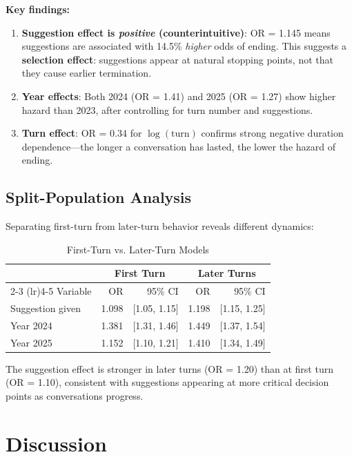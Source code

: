 \documentclass[11pt]{article}
\begin{document}
\textbf{Key findings:}
\begin{enumerate}
    \item \textbf{Suggestion effect is \textit{positive} (counterintuitive)}: OR = 1.145 means suggestions are associated with 14.5\% \textit{higher} odds of ending. This suggests a \textbf{selection effect}: suggestions appear at natural stopping points, not that they cause earlier termination.

    \item \textbf{Year effects}: Both 2024 (OR = 1.41) and 2025 (OR = 1.27) show higher hazard than 2023, after controlling for turn number and suggestions.

    \item \textbf{Turn effect}: OR = 0.34 for $\log(\text{turn})$ confirms strong negative duration dependence---the longer a conversation has lasted, the lower the hazard of ending.
\end{enumerate}

\subsection{Split-Population Analysis}

Separating first-turn from later-turn behavior reveals different dynamics:

\begin{table}[h]
\centering
\caption{First-Turn vs. Later-Turn Models}
\label{tab:split}
\begin{tabular}{lrrrr}
\toprule
& \multicolumn{2}{c}{First Turn} & \multicolumn{2}{c}{Later Turns} \\
\cmidrule(lr){2-3} \cmidrule(lr){4-5}
Variable & OR & 95\% CI & OR & 95\% CI \\
\midrule
Suggestion given & 1.098 & [1.05, 1.15] & 1.198 & [1.15, 1.25] \\
Year 2024 & 1.381 & [1.31, 1.46] & 1.449 & [1.37, 1.54] \\
Year 2025 & 1.152 & [1.10, 1.21] & 1.410 & [1.34, 1.49] \\
\bottomrule
\end{tabular}
\end{table}

The suggestion effect is stronger in later turns (OR = 1.20) than at first turn (OR = 1.10), consistent with suggestions appearing at more critical decision points as conversations progress.

\section{Discussion}
\end{document}

